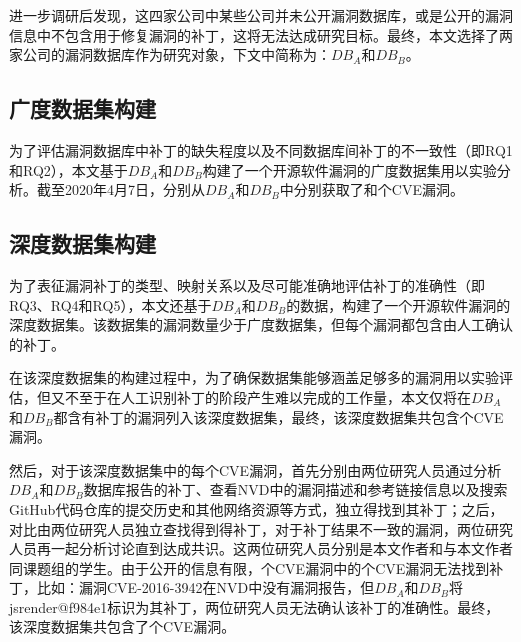 进一步调研后发现，这四家公司中某些公司并未公开漏洞数据库，或是公开的漏洞信息中不包含用于修复漏洞的补丁，这将无法达成研究目标。最终，本文选择了两家公司的漏洞数据库作为研究对象，下文中简称为：$DB_A$和$DB_B$。


\subsection{广度数据集构建}
为了评估漏洞数据库中补丁的缺失程度以及不同数据库间补丁的不一致性（即RQ1和RQ2），本文基于$DB_A$和$DB_B$构建了一个开源软件漏洞的广度数据集用以实验分析。截至2020年4月7日，分别从$DB_A$和$DB_B$中分别获取了和个CVE漏洞。

\subsection{深度数据集构建}
为了表征漏洞补丁的类型、映射关系以及尽可能准确地评估补丁的准确性（即RQ3、RQ4和RQ5），本文还基于$DB_A$和$DB_B$的数据，构建了一个开源软件漏洞的深度数据集。该数据集的漏洞数量少于广度数据集，但每个漏洞都包含由人工确认的补丁。%

在该深度数据集的构建过程中，为了确保数据集能够涵盖足够多的漏洞用以实验评估，但又不至于在人工识别补丁的阶段产生难以完成的工作量，本文仅将在$DB_A$和$DB_B$都含有补丁的漏洞列入该深度数据集，最终，该深度数据集共包含个CVE漏洞。



然后，对于该深度数据集中的每个CVE漏洞，首先分别由两位研究人员通过分析$DB_A$和$DB_B$数据库报告的补丁、查看NVD中的漏洞描述和参考链接信息以及搜索GitHub代码仓库的提交历史和其他网络资源等方式，独立得找到其补丁；之后，对比由两位研究人员独立查找得到得补丁，对于补丁结果不一致的漏洞，两位研究人员再一起分析讨论直到达成共识。这两位研究人员分别是本文作者和与本文作者同课题组的学生。由于公开的信息有限，个CVE漏洞中的个CVE漏洞无法找到补丁，比如：漏洞CVE-2016-3942在NVD中没有漏洞报告，但$DB_A$和$DB_B$将 jsrender@f984e1\cite{jsrender}标识为其补丁，两位研究人员无法确认该补丁的准确性。最终，该深度数据集共包含了个CVE漏洞。

